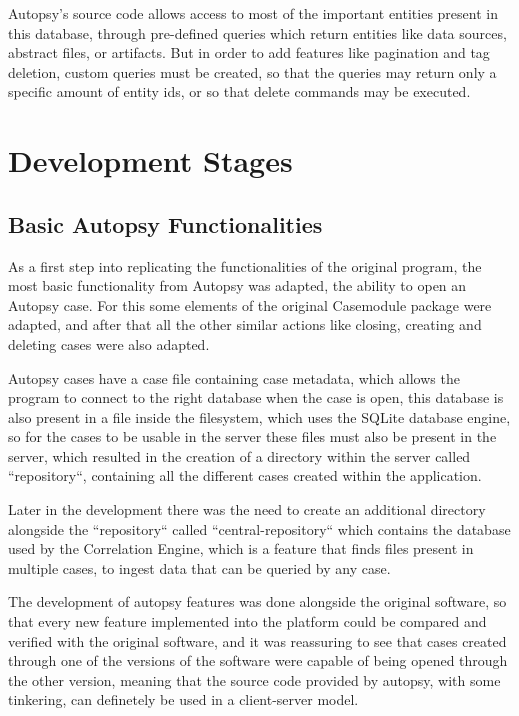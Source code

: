 Autopsy's source code allows access to most of the important entities present in this database, through pre-defined queries which return entities like data sources, abstract files, or artifacts. 
But in order to add features like pagination and tag deletion, custom queries must be created, so that the queries may return only a specific amount of entity ids, or so that delete commands may be executed. 

\section{Development Stages}

\subsection{Basic Autopsy Functionalities}

As a first step into replicating the functionalities of the original program, the most basic functionality from Autopsy was adapted, the ability to open an Autopsy case. For this some elements of the original Casemodule package were adapted,
and after that all the other similar actions like closing, creating and deleting cases were also adapted.

Autopsy cases have a case file containing case metadata, which allows the program to connect to the right database when the case is open, this database is also present
in a file inside the filesystem, which uses the SQLite database engine, so for the cases to be usable in the server these files must also be present in the server,
which resulted in the creation of a directory within the server called ``repository``, containing all the different cases created within the application.

Later in the development there was the need to create an additional directory alongside the ``repository`` called ``central-repository``
which contains the database used by the Correlation Engine, which is a feature that finds files present in multiple cases, to ingest data that can be queried by any case.

The development of autopsy features was done alongside the original software, so that every new feature implemented into the platform could be compared and verified with the original software, and it was reassuring to see that cases created 
through one of the versions of the software were capable of being opened through the other version, meaning that the source code provided by autopsy, with some tinkering, can definetely be used in a client-server model.

